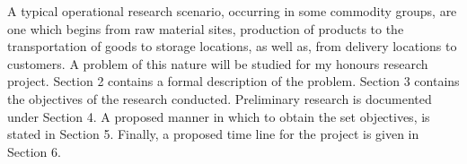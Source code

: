 \begin{flushleft}
A typical operational research scenario, occurring in some commodity groups, are one which begins from raw material sites, production of products to the transportation of goods to storage locations, as well as, from delivery locations to customers. A problem of this nature will be studied for my honours research project. Section 2 contains a formal description of the problem.  Section 3 contains the objectives of the research conducted. Preliminary research is documented under Section 4.  A proposed manner in which to obtain the set objectives, is stated in Section 5. Finally, a proposed time line for the project is given in Section 6.
\end{flushleft}
 